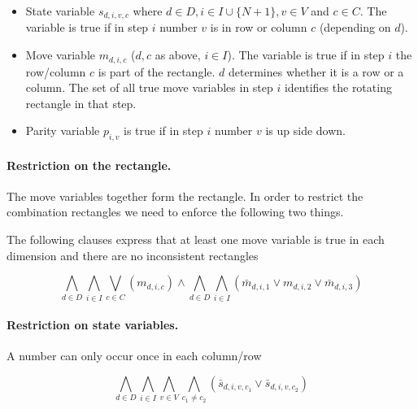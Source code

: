 \documentclass[]{llncs}
\begin{document}
\begin{itemize} 

\item State variable $s_{d,i,v,c}$ where $d\in D, i \in I\cup \{N+1\}, v \in V$ and $c \in C$. The variable  is true if in  step $i$
number $v$ is in row or column $c$ (depending on $d$). 

\item Move variable $m_{d,i,c}$ ($d,c$ as above, $i\in I$). The variable is true if in step $i$ the row/column $c$ is
part of the rectangle. $d$ determines whether it is a row or a column. The set of all true move variables in step $i$
identifies the rotating rectangle in that step. 

\item Parity variable $p_{i,v}$ is true if in step $i$ number $v$ is up side down. 

\end{itemize}


\paragraph{Restriction on the rectangle.} 
%

The move variables together form the rectangle. In order to restrict the
combination rectangles we need to enforce the following two things.

The following clauses express that at least one move variable is true in each dimension and there are no inconsistent rectangles  

\begin{equation}
\bigwedge_{d \in D}\bigwedge_{i\in I} \bigvee_{c\in C}  (m_{d,i,c}) \wedge \bigwedge_{d \in D} \bigwedge_{i \in I} (\bar
m_{d,i,1} \vee m_{d,i,2} \vee \bar m_{d,i,3})
\end{equation}

\paragraph{Restriction on state variables.} 
%

A number can only occur once in each column/row

\begin{equation}
\bigwedge_{d \in D}\bigwedge_{i\in I} \bigwedge_{v\in V} \bigwedge_{c_1 \neq c_2} (\bar s_{d,i,v,c_1} \vee \bar
s_{d,i,v,c_2})
\end{equation}
\end{document}
